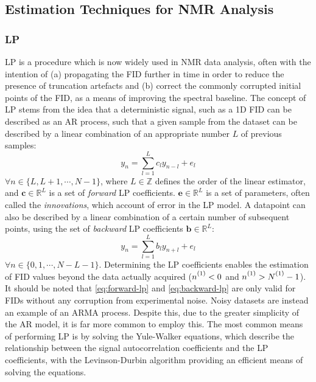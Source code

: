 \subsection{Estimation Techniques for NMR Analysis}

\subsubsection{\Acl{LP}}

\Ac{LP}\cite{Stephenson1988,Koehl1999} is a procedure which is now widely used
in \ac{NMR} data analysis, often with the intention of (a) propagating the
\ac{FID} further in time in order to reduce the presence of truncation
artefacts and (b) correct the commonly corrupted initial points of the
\ac{FID}, as a means of improving the spectral baseline. The concept of \ac{LP}
stems from the idea that a deterministic signal, such as a \ac{1D} \ac{FID} can
be described as an \ac{AR} process, such that a given sample from the dataset
can be described by a linear combination of an appropriate number $L$ of
previous samples:
\begin{equation}
    y_n = \sum_{l=1}^{L}
    c_l y_{n-l} + e_l
    \label{eq:forward-lp}
\end{equation}
$\forall n \in \lbrace L, L + 1, \cdots, N - 1 \rbrace$, where $L \in
\mathbb{Z}$ defines the order of the linear estimator, and $\symbf{c} \in
\mathbb{R}^{L}$ is a set of \emph{forward} \ac{LP} coefficients. $\symbf{e} \in
\mathbb{R}^L$ is a set of parameters, often called the \emph{innovations},
which account of error in the \ac{LP} model. A datapoint can also be described
by a linear combination of a certain number of subsequent points, using the set
of \emph{backward} \ac{LP} coefficients $\symbf{b} \in \mathbb{R}^L$:
\begin{equation}
    y_n = \sum_{l=1}^{L}
    b_l y_{n+l} + e_l
    \label{eq:backward-lp}
\end{equation}
$\forall n \in \lbrace 0, 1, \cdots, N - L - 1 \rbrace$. Determining
the \ac{LP} coefficients enables the estimation of \ac{FID} values beyond the
data actually acquired ($\none < 0$ and $\none > \None - 1$). It should be noted that
\eqref{eq:forward-lp} and \eqref{eq:backward-lp} are only valid for
\acp{FID} without any corruption from experimental noise. Noisy datasets are
instead an example of an \ac{ARMA} process. Despite this, due to the greater
simplicity of the \ac{AR} model, it is far more common to employ this. The most
common means of performing \ac{LP} is by solving the Yule-Walker
equations\cite{Yule1927,Walker1931},
which describe the relationship between the signal autocorrelation coefficients
and the \ac{LP} coefficients\cite[Section 3.3]{Koehl1999}, with the
Levinson-Durbin algorithm providing an efficient means of solving the
equations\cite{Levinson1946,Durbin1960}.

